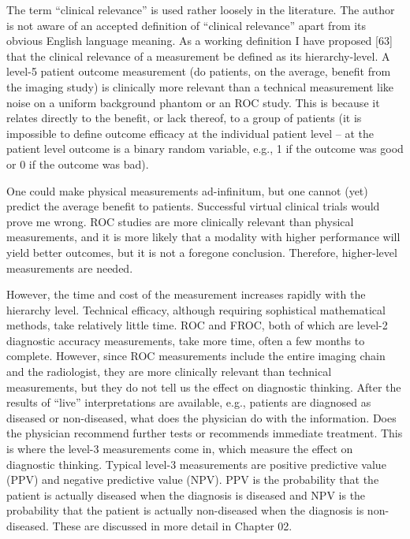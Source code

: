 \documentclass[
]{book}
\begin{document}
The term ``clinical relevance'' is used rather loosely in the literature. The author is not aware of an accepted definition of ``clinical relevance'' apart from its obvious English language meaning. As a working definition I have proposed {[}63{]} that the clinical relevance of a measurement be defined as its hierarchy-level. A level-5 patient outcome measurement (do patients, on the average, benefit from the imaging study) is clinically more relevant than a technical measurement like noise on a uniform background phantom or an ROC study. This is because it relates directly to the benefit, or lack thereof, to a group of patients (it is impossible to define outcome efficacy at the individual patient level -- at the patient level outcome is a binary random variable, e.g., 1 if the outcome was good or 0 if the outcome was bad).

One could make physical measurements ad-infinitum, but one cannot (yet) predict the average benefit to patients. Successful virtual clinical trials would prove me wrong. ROC studies are more clinically relevant than physical measurements, and it is more likely that a modality with higher performance will yield better outcomes, but it is not a foregone conclusion. Therefore, higher-level measurements are needed.

However, the time and cost of the measurement increases rapidly with the hierarchy level. Technical efficacy, although requiring sophistical mathematical methods, take relatively little time. ROC and FROC, both of which are level-2 diagnostic accuracy measurements, take more time, often a few months to complete. However, since ROC measurements include the entire imaging chain and the radiologist, they are more clinically relevant than technical measurements, but they do not tell us the effect on diagnostic thinking. After the results of ``live'' interpretations are available, e.g., patients are diagnosed as diseased or non-diseased, what does the physician do with the information. Does the physician recommend further tests or recommends immediate treatment. This is where the level-3 measurements come in, which measure the effect on diagnostic thinking. Typical level-3 measurements are positive predictive value (PPV) and negative predictive value (NPV). PPV is the probability that the patient is actually diseased when the diagnosis is diseased and NPV is the probability that the patient is actually non-diseased when the diagnosis is non-diseased. These are discussed in more detail in Chapter 02.
\end{document}
